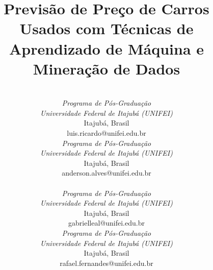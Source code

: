 \documentclass[conference]{IEEEtran}
\begin{document}
\title{Previsão de Preço de Carros Usados com Técnicas de Aprendizado de Máquina e Mineração de Dados}

\author{%
\begin{tabular}{cc}
\begin{minipage}[b]{0.42\linewidth}\centering
{\large Luis Ricardo Santos}\\[0.4em]
\textit{Programa de Pós-Graduação} \\
\textit{Universidade Federal de Itajubá (UNIFEI)}\\
Itajubá, Brasil \\
luis.ricardo@unifei.edu.br
\end{minipage}
&
\begin{minipage}[b]{0.42\linewidth}\centering
{\large Anderson Candido Alves}\\[0.4em]
\textit{Programa de Pós-Graduação} \\
\textit{Universidade Federal de Itajubá (UNIFEI)}\\
Itajubá, Brasil \\
anderson.alves@unifei.edu.br
\end{minipage}
\\[2.5em]
\begin{minipage}[b]{0.42\linewidth}\centering
{\large Gabriel Leal dos Santos}\\[0.4em]
\textit{Programa de Pós-Graduação} \\
\textit{Universidade Federal de Itajubá (UNIFEI)}\\
Itajubá, Brasil \\
gabrielleal@unifei.edu.br
\end{minipage}
&
\begin{minipage}[b]{0.42\linewidth}\centering
{\large Rafael Fernandes Pereira}\\[0.4em]
\textit{Programa de Pós-Graduação} \\
\textit{Universidade Federal de Itajubá (UNIFEI)}\\
Itajubá, Brasil \\
rafael.fernandes@unifei.edu.br
\end{minipage}
\end{tabular}%
}

\maketitle
\end{document}
